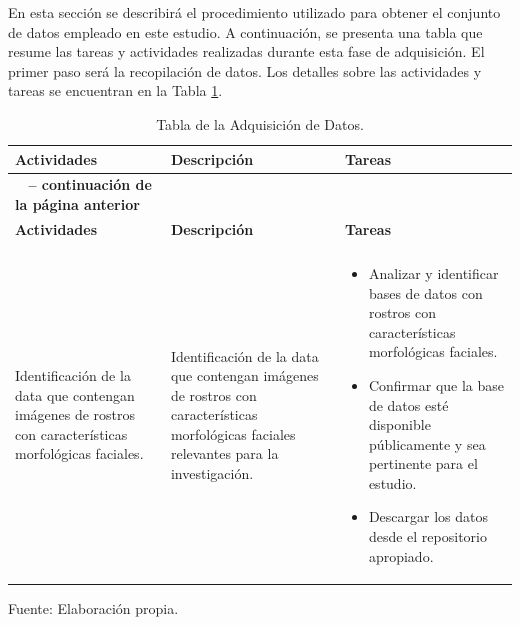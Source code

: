 En esta sección se describirá el procedimiento utilizado para obtener el conjunto de datos empleado en este estudio. A continuación, se presenta una tabla que resume las tareas y actividades realizadas durante esta fase de adquisición. El primer paso será la recopilación de datos. Los detalles sobre las actividades y tareas se encuentran en la Tabla \ref{tabla:actividades}.
 
 \begin{longtable}{>{\raggedright\arraybackslash}p{4cm} >{\raggedright\arraybackslash}p{4cm} >{\raggedright\arraybackslash}p{5cm}}
    \caption{Tabla de la Adquisición de Datos.}
    \label{tabla:actividades}\\
    \hline
    \textbf{Actividades} & \textbf{Descripción} & \textbf{Tareas}\\
    \hline
    \endfirsthead

    \multicolumn{3}{c}%
    {{\bfseries \tablename\ \thetable{} -- continuación de la página anterior}} \\
    \hline
    \textbf{Actividades} & \textbf{Descripción} & \textbf{Tareas}\\
    \hline
    \endhead

    \hline
    \multicolumn{3}{r}{{Continúa en la siguiente página}} \\
    \endfoot

    \hline
    \endlastfoot

    Identificación de la data que contengan imágenes de rostros con características morfológicas faciales. & Identificación de la data que contengan imágenes de rostros con características morfológicas faciales relevantes para la investigación. & 
    \begin{itemize}
        \item Analizar y identificar bases de datos con rostros con características morfológicas faciales.
        \item Confirmar que la base de datos esté disponible públicamente y sea pertinente para el estudio.
        \item Descargar los datos desde el repositorio apropiado.
    \end{itemize} \\
\end{longtable}

\begin{flushleft}
    \small Fuente: Elaboración propia.
\end{flushleft}


